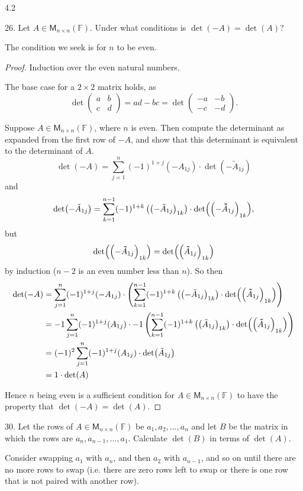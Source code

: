 \documentclass[11pt]{article}
\newcommand{\br}[1]{\left(#1\right)}
\newcommand{\vardbtilde}[1]{\tilde{\raisebox{0pt}[0.85\height]{$\tilde{#1}$}}}
\begin{document}
4.2

26. Let $A\in\mathsf{M}_{n\times n}(\mathbb{F})$. Under what conditions is $\det(-A) = \det(A)$?

The condition we seek is for $n$ to be even. \begin{proof}
    Induction over the even natural numbers.

    The base case for a $2\times 2$ matrix holds, as $$\det\begin{pmatrix}
        a & b \\ c & d
    \end{pmatrix} = ad-bc = \det\begin{pmatrix}
        -a & -b \\ -c & -d
    \end{pmatrix}.$$

    Suppose $A\in\mathsf{M}_{n\times n}(\mathbb{F})$, where $n$ is even. Then compute the determinant as expanded from the first row of $-A$, and show that this determinant is equivalent to the determinant of $A$. $$\det(-A) = \sum_{j=1}^n (-1)^{1+j}(-A_{1j})\cdot \det(-\tilde{A}_{1j})$$ and $$\det(-\tilde{A}_{1j}) = \sum_{k = 1}^{n-1} (-1)^{1+k}\br{\br{-\tilde{A}_{1j}}_{1k}}\cdot \det(\br{-\vardbtilde{A}_{1j}}_{1k}),$$ but $$\det(\br{-\vardbtilde{A}_{1j}}_{1k}) = \det(\br{\vardbtilde{A}_{1j}}_{1k})$$ by induction ($n-2$ is an even number less than $n$). So then \begin{align*}
        \det(-A) &= \sum_{j=1}^n (-1)^{1+j}(-A_{1j})\cdot \br{\sum_{k = 1}^{n-1} (-1)^{1+k}\br{\br{-\tilde{A}_{1j}}_{1k}}\cdot \det(\br{\vardbtilde{A}_{1j}}_{1k})} \\
        &= -1\sum_{j=1}^n (-1)^{1+j}(A_{1j})\cdot -1\br{\sum_{k = 1}^{n-1} (-1)^{1+k}\br{\br{\tilde{A}_{1j}}_{1k}}\cdot \det(\br{\vardbtilde{A}_{1j}}_{1k})} \\
        &= (-1)^2\sum_{j=1}^n (-1)^{1+j}(A_{1j})\cdot \det(\tilde{A}_{1j}) \\
        &= 1 \cdot \det(A)
    \end{align*}

    Hence $n$ being even is a sufficient condition for $A\in\mathsf{M}_{n\times n}(\mathbb{F})$ to have the property that $\det(-A) = \det(A)$.
\end{proof}

30. Let the rows of $A\in\mathsf{M}_{n\times n}(\mathbb{F})$ be $a_1,a_2,\dots,a_n$ and let $B$ be the matrix in which the rows are $a_n,a_{n-1},\dots, a_1$. Calculate $\det(B)$ in terms of $\det(A)$.

Consider swapping $a_1$ with $a_n$, and then $a_2$ with $a_{n-1}$, and so on until there are no more rows to swap (i.e. there are zero rows left to swap or there is one row that is not paired with another row).
\end{document}
